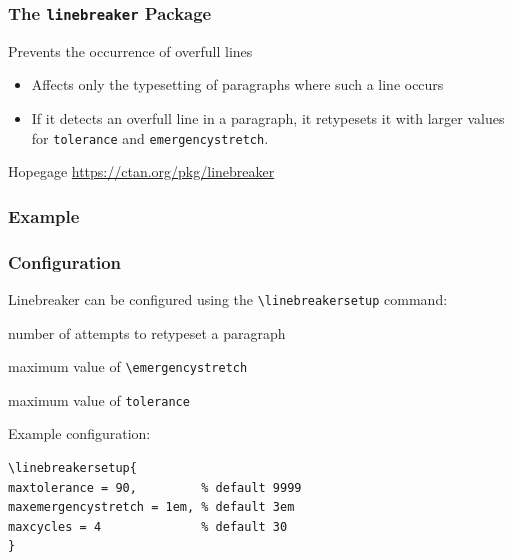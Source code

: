 \begin{frame}[fragile]
  \frametitle{The \texttt{linebreaker} Package}
  Prevents the occurrence of overfull lines
  \begin{itemize}
    \item Affects only the typesetting of paragraphs where such a line occurs
    \item If it detects an overfull line in a paragraph, it retypesets it with larger values for
      \verb|tolerance| and \verb|emergencystretch|.
  \end{itemize}

  \bigskip

\begin{block}{Hopegage}
  \url{https://ctan.org/pkg/linebreaker}
\end{block}
\end{frame}

\begin{frame}
  \frametitle{Example}
\end{frame}

\begin{frame}[fragile]
  \frametitle{Configuration}
  Linebreaker can be configured using the \verb|\linebreakersetup| command:

  \bigskip

  \begin{description}[maxemergencystretch]
    \item[maxcycles] number of attempts to retypeset a paragraph
    \item[maxemergencystretch] maximum value of \verb|\emergencystretch|
    \item[maxtolerance]  maximum value of \verb|tolerance|
  \end{description}

  \bigskip

\begin{block}{Example configuration:}
\begin{verbatim}
\linebreakersetup{
maxtolerance = 90,         % default 9999
maxemergencystretch = 1em, % default 3em
maxcycles = 4              % default 30
}
\end{verbatim}
\end{block}

\end{frame}

